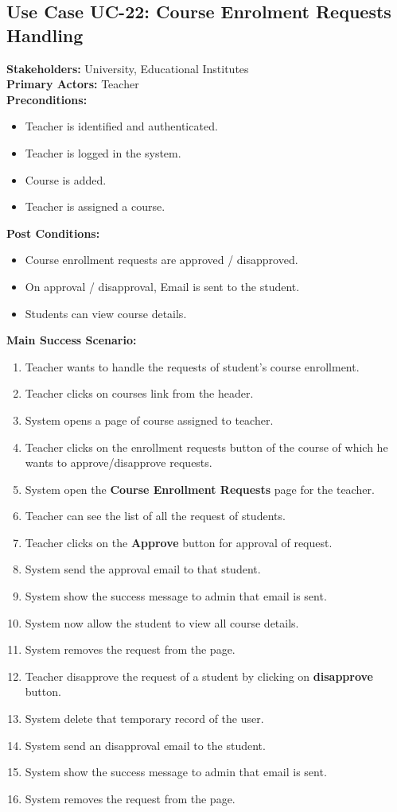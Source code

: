 \subsection{Use Case UC-22: Course Enrolment Requests Handling}
\textbf{Stakeholders: } University, Educational Institutes \\
\textbf{Primary Actors: } Teacher \\
\textbf{Preconditions:}
\begin{itemize}
\item Teacher is identified and authenticated.
\item Teacher is logged in the system.
\item Course is added.
\item Teacher is assigned a course.
\end{itemize}
\textbf{Post Conditions: }
\begin{itemize}
\item Course enrollment requests are approved / disapproved.
\item On approval / disapproval, Email is sent to the student.
\item Students can view course details.
\end{itemize}
\textbf{Main Success Scenario:}
\begin{enumerate}
\item Teacher wants to handle the requests of student's course enrollment.
\item Teacher clicks on courses link from the header.
\item System opens a page of course assigned to teacher.
\item Teacher clicks on the enrollment requests button of the course of which he wants to approve/disapprove requests.
\item System open the \textbf{Course Enrollment Requests} page for the teacher.
\item Teacher can see the list of all the request of students.
\item Teacher clicks on the \textbf{Approve} button for approval of request.
\item System send the approval email to that student.
\item System show the success message to admin that email is sent.
\item System now allow the student to view all course details.
\item System removes the request from the page.
\item Teacher disapprove the request of a student by clicking on \textbf{disapprove} button.
\item System delete that temporary record of the user.
\item System send an disapproval email to the student.
\item System show the success message to admin that email is sent.
\item System removes the request from the page.
\end{enumerate}
